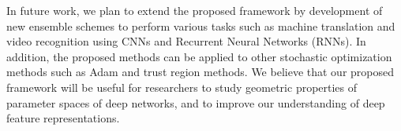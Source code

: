 \documentclass[10pt,journal,compsoc]{IEEEtran}
\theoremstyle{definition}
\theoremstyle{definition}
\theoremstyle{remark}
\theoremstyle{remark}
\theoremstyle{remark}
\begin{document}
In future work, we plan to extend the proposed framework by development of new ensemble schemes to perform various tasks such as machine translation and video recognition using CNNs and Recurrent Neural Networks (RNNs). In addition, the proposed methods can be applied to other stochastic optimization methods such as Adam and trust region methods. We believe that our proposed framework will be useful for researchers to study geometric properties of parameter spaces of deep networks, and to improve our understanding of deep feature representations.







%
\end{document}
